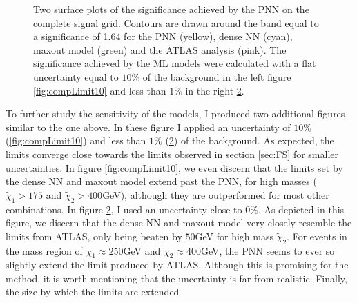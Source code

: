 \begin{figure}
{\begin{subfigure}{.6\textwidth}
        \vspace*{-48.7ex}  %
        \begin{center}
        \footnotesize
        \hspace{-37ex}
        \cite{atlas_search_2021}
        \end{center}
        \vspace*{43ex}
        \vspace{-1.cm}
        \caption{}
        \label{fig:compLimit1}
    \end{subfigure}
    }
    \caption[Two surface plots of the significance comparing sensitivity limits set by \acs{PNN}, dense \acs{NN}, maxout model
    and the \acs{ATLAS} analysis, where the models have assumed a flat uncertainty of $10\%$ and $<1\%$ respectively.]{Two surface plots 
    of the significance achieved by the \acs{PNN} on the complete signal grid. Contours are drawn around the band equal to a 
    significance of 1.64 for the \acs{PNN} (yellow), dense \acs{NN} (cyan), maxout model (green) and the \acs{ATLAS} analysis \cite{atlas_search_2021} (pink). The 
    significance achieved by the \acs{ML} models were calculated with a flat uncertainty equal to $10\%$ of the background in the left 
    figure \ref{fig:compLimit10} and less than $1\%$ in the right \ref{fig:compLimit1}.}
\end{figure}
To further study the sensitivity of the models, I produced two additional figures similar to the one above. In these figure I applied an uncertainty of 
$10\%$ (\ref{fig:compLimit10}) and less than $1\%$ (\ref{fig:compLimit1}) of the background. As expected, the limits converge close towards the limits 
observed in section \ref{sec:FS} for smaller uncertainties. In figure \ref{fig:compLimit10}, we even discern that the limits set by the dense \acs{NN}
and maxout model extend past the \ac{PNN}, for high masses ($\tilde{\chi}_1>175$ and $\tilde{\chi}_2>400$GeV), although they are outperformed for most other combinations.
In figure \ref{fig:compLimit1}, I used an uncertainty close to $0\%$. As depicted in this figure, we discern that the dense \ac{NN} and maxout model 
very closely resemble the limits from \ac{ATLAS}, only being beaten by $50$GeV for high mass $\tilde{\chi}_2$. For events in the mass region of
$\tilde{\chi}_1\approx250$GeV and $\tilde{\chi}_2\approx400$GeV, the \ac{PNN} seems to ever so slightly extend the limit produced by \ac{ATLAS}.
Although this is promising for the method, it is worth mentioning that the uncertainty is far from realistic. Finally, the size by which the limits are extended
